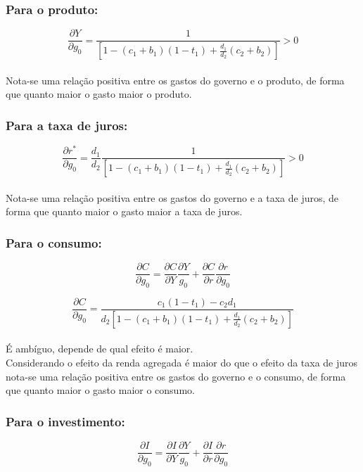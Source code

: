 \documentclass{article}
\begin{document}
\subsubsection*{Para o produto:}
\begin{equation}
\frac{\partial Y}{\partial g_0} = \frac{1}{[1-(c_1+b_1)(1-t_1)+\frac{d_1}{d_2}(c_2+b_2)]} > 0
\end{equation}
\\
Nota-se uma relação positiva entre os gastos do governo e o produto, de forma que quanto maior o gasto maior o produto.

\subsubsection*{Para a taxa de juros:}
\begin{equation}
\frac{\partial r^*}{\partial g_0} = \frac{d_1}{d_2} \frac{1}{[1-(c_1+b_1)(1-t_1)+\frac{d_1}{d_2}(c_2+b_2)]} > 0
\end{equation}
\\
Nota-se uma relação positiva entre os gastos do governo e a taxa de juros, de forma que quanto maior o gasto maior a taxa de juros.

\subsubsection*{Para o consumo:}
\begin{equation}
\frac{\partial C}{\partial g_0} = \frac{\partial C}{\partial Y}\frac{\partial Y}{g_0} + \frac{\partial C}{\partial r}\frac{\partial r}{\partial g_0}
\end{equation}

\begin{equation}
\frac{\partial C}{\partial g_0} = \frac{c_1(1-t_1)- c_2 d_1}{d_2[1-(c_1+b_1)(1-t_1)+\frac{d_1}{d_2}(c_2+b_2)]}
\end{equation}
\\
É ambíguo, depende de qual efeito é maior.\\
Considerando o efeito da renda agregada é maior do que o efeito da taxa de juros nota-se uma relação positiva entre os gastos do governo e o consumo, de forma que quanto maior o gasto maior o consumo.
\bigskip

\subsubsection*{Para o investimento:}
\begin{equation}
\frac{\partial I}{\partial g_0} = \frac{\partial I}{\partial Y}\frac{\partial Y}{g_0} + \frac{\partial I}{\partial r}\frac{\partial r}{\partial g_0}
\end{equation}
\end{document}
